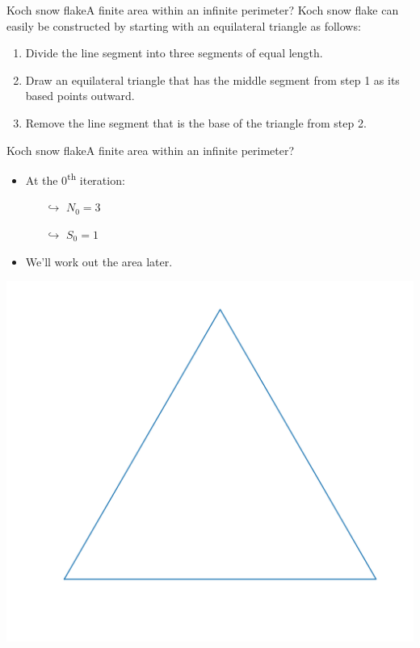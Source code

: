 \documentclass[usenames,dvipsnames,svgnames,10pt,aspectratio=169]{beamer}
\begin{document}
\begin{frame}[t, c]{Koch snow flake}{A finite area within an infinite perimeter?}
	Koch snow flake can easily be constructed by starting with an equilateral triangle as follows:
	\begin{enumerate}
		\item Divide the line segment into three segments of equal length.
		\item Draw an equilateral triangle that has the middle segment from step 1 as its based points outward.
		\item Remove the line segment that is the base of the triangle from step 2.
	\end{enumerate}

	\vspace{1cm}
\end{frame}

\begin{frame}[t, c]{Koch snow flake}{A finite area within an infinite perimeter?}
	\centering
	\begin{minipage}{.48\textwidth}
		\begin{itemize}
			\item At the 0\textsuperscript{th} iteration:
			\begin{itemize}
				\item[$\hookrightarrow$] $N_0 = 3$
				\item[$\hookrightarrow$] $S_0 = 1$
			\end{itemize}

			\bigskip

			\item We'll work out the area later.
		\end{itemize}
	\end{minipage}%
	\hfill
	\begin{minipage}{.48\textwidth}
		\centering
		\includegraphics[width=.8\textwidth]{koch_0_it}
	\end{minipage}

	\vspace{1cm}
\end{frame}
\end{document}
